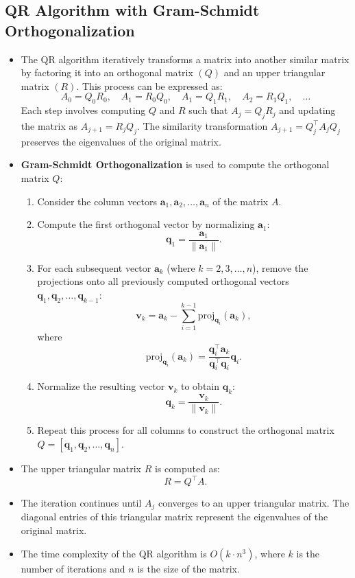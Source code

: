 \documentclass[12pt,letterpaper,onecolumn]{exam}
\begin{document}
\subsection{QR Algorithm with Gram-Schmidt Orthogonalization}
\begin{itemize}
    \item The QR algorithm iteratively transforms a matrix into another similar matrix by factoring it into an orthogonal matrix $(Q)$ and an upper triangular matrix $(R)$. This process can be expressed as:
    \[
    A_0 = Q_0 R_0, \quad A_1 = R_0 Q_0, \quad A_1 = Q_1 R_1, \quad A_2 = R_1 Q_1, \quad \dots
    \]
    Each step involves computing $Q$ and $R$ such that $A_j = Q_j R_j$ and updating the matrix as $A_{j+1} = R_j Q_j$. The similarity transformation $A_{j+1} = Q_j^{\top} A_j Q_j$ preserves the eigenvalues of the original matrix.

    \item \textbf{Gram-Schmidt Orthogonalization} is used to compute the orthogonal matrix $Q$:
    \begin{enumerate}
        \item Consider the column vectors $\mathbf{a}_1, \mathbf{a}_2, \dots, \mathbf{a}_n$ of the matrix $A$.
        \item Compute the first orthogonal vector by normalizing $\mathbf{a}_1$:
        \[
        \mathbf{q}_1 = \frac{\mathbf{a}_1}{\|\mathbf{a}_1\|}.
        \]
        \item For each subsequent vector $\mathbf{a}_k$ (where $k = 2, 3, \dots, n$), remove the projections onto all previously computed orthogonal vectors $\mathbf{q}_1, \mathbf{q}_2, \dots, \mathbf{q}_{k-1}$:
        \[
        \mathbf{v}_k = \mathbf{a}_k - \sum_{i=1}^{k-1} \text{proj}_{\mathbf{q}_i} (\mathbf{a}_k),
        \]
        where
        \[
        \text{proj}_{\mathbf{q}_i} (\mathbf{a}_k) = \frac{\mathbf{q}_i^{\top} \mathbf{a}_k}{\mathbf{q}_i^{\top} \mathbf{q}_i} \mathbf{q}_i.
        \]
        \item Normalize the resulting vector $\mathbf{v}_k$ to obtain $\mathbf{q}_k$:
        \[
        \mathbf{q}_k = \frac{\mathbf{v}_k}{\|\mathbf{v}_k\|}.
        \]
        \item Repeat this process for all columns to construct the orthogonal matrix $Q = [\mathbf{q}_1, \mathbf{q}_2, \dots, \mathbf{q}_n]$.
    \end{enumerate}

    \item The upper triangular matrix $R$ is computed as:
    \[
    R = Q^{\top} A.
    \]

    \item The iteration continues until $A_j$ converges to an upper triangular matrix. The diagonal entries of this triangular matrix represent the eigenvalues of the original matrix.

    \item The time complexity of the QR algorithm is $O(k \cdot n^3)$, where $k$ is the number of iterations and $n$ is the size of the matrix.
\end{itemize}
\end{document}
